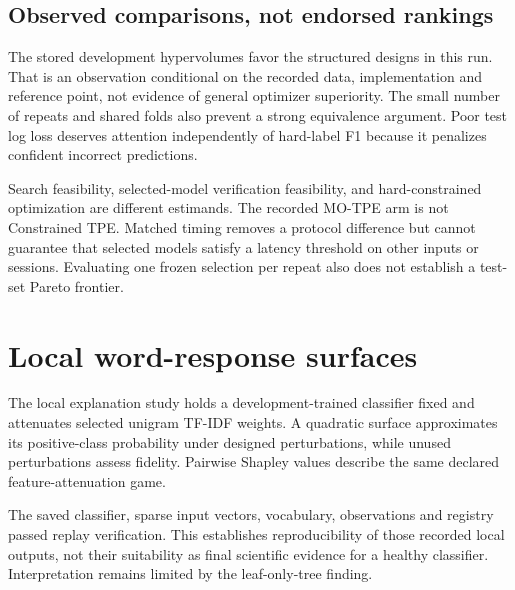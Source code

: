 \documentclass[12pt,a4paper]{article}
\begin{document}
\subsection{Observed comparisons, not endorsed rankings}
\begin{table}[htbp]\centering\small

\caption{Provisional observations reconstructed from the saved campaign. Hypervolume (HV) describes development fronts; test F1 and log loss describe frozen selected models, averaged across search repeats. Larger HV/F1 and smaller log loss are preferable. HV SD is across search repeats. The unresolved calibration anomaly prevents a superiority claim.}
\end{table}

The stored development hypervolumes favor the structured designs in this run. That is an observation conditional on the recorded data, implementation and reference point, not evidence of general optimizer superiority. The small number of repeats and shared folds also prevent a strong equivalence argument. Poor test log loss deserves attention independently of hard-label F1 because it penalizes confident incorrect predictions.

Search feasibility, selected-model verification feasibility, and hard-constrained optimization are different estimands. The recorded MO-TPE arm is not Constrained TPE. Matched timing removes a protocol difference but cannot guarantee that selected models satisfy a latency threshold on other inputs or sessions. Evaluating one frozen selection per repeat also does not establish a test-set Pareto frontier.

\section{Local word-response surfaces}
The local explanation study holds a development-trained classifier fixed and attenuates selected unigram TF-IDF weights. A quadratic surface approximates its positive-class probability under designed perturbations, while unused perturbations assess fidelity. Pairwise Shapley values describe the same declared feature-attenuation game.

The saved classifier, sparse input vectors, vocabulary, observations and registry passed replay verification. This establishes reproducibility of those recorded local outputs, not their suitability as final scientific evidence for a healthy classifier. Interpretation remains limited by the leaf-only-tree finding.
\end{document}
